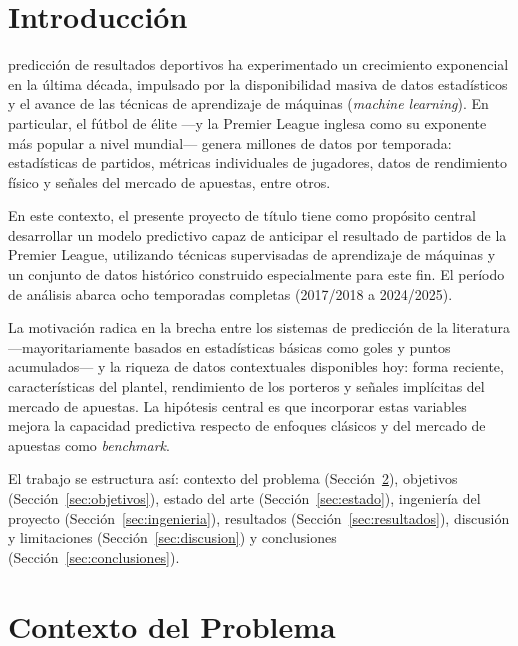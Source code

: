 \documentclass{ieeeaccess}
\begin{document}
\titlepgskip=-15pt

\maketitle

\section{Introducción}
\label{sec:introduction}
 predicción de resultados deportivos ha experimentado un crecimiento exponencial en la última década, impulsado por la disponibilidad masiva de datos estadísticos y el avance de las técnicas de aprendizaje de máquinas (\textit{machine learning}). En particular, el fútbol de élite ---y la Premier League inglesa como su exponente más popular a nivel mundial--- genera millones de datos por temporada: estadísticas de partidos, métricas individuales de jugadores, datos de rendimiento físico y señales del mercado de apuestas, entre otros.

En este contexto, el presente proyecto de título tiene como propósito central desarrollar un modelo predictivo capaz de anticipar el resultado de partidos de la Premier League, utilizando técnicas supervisadas de aprendizaje de máquinas y un conjunto de datos histórico construido especialmente para este fin. El período de análisis abarca ocho temporadas completas (2017/2018 a 2024/2025).

La motivación radica en la brecha entre los sistemas de predicción de la literatura ---mayoritariamente basados en estadísticas básicas como goles y puntos acumulados--- y la riqueza de datos contextuales disponibles hoy: forma reciente, características del plantel, rendimiento de los porteros y señales implícitas del mercado de apuestas. La hipótesis central es que incorporar estas variables mejora la capacidad predictiva respecto de enfoques clásicos y del mercado de apuestas como \textit{benchmark}.

El trabajo se estructura así: contexto del problema (Sección~\ref{sec:contexto}), objetivos (Sección~\ref{sec:objetivos}), estado del arte (Sección~\ref{sec:estado}), ingeniería del proyecto (Sección~\ref{sec:ingenieria}), resultados (Sección~\ref{sec:resultados}), discusión y limitaciones (Sección~\ref{sec:discusion}) y conclusiones (Sección~\ref{sec:conclusiones}).

\section{Contexto del Problema}
\label{sec:contexto}
\end{document}
